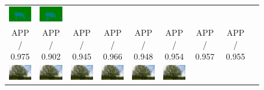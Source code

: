 \documentclass[10pt,twocolumn,letterpaper]{article}
\begin{document}
\begin{figure} [tb]
\begin{tabular*}{0.4\textwidth}{ccccccccc}
\includegraphics[width=2.15cm]{images/1_30_s_J_lmnn_5_label.jpg} & \hspace{-5mm}
\includegraphics[width=2.15cm]{images/1_30_s_A_lmnn_5_label.jpg} & \\
\scriptsize{APP / 0.975} & \scriptsize{APP / 0.902} & \scriptsize{APP / 0.945} & \scriptsize{APP / 0.966} & \scriptsize{APP / 0.948}
 & \scriptsize{APP / 0.954} & \scriptsize{APP / 0.957} & \scriptsize{APP / 0.955}\\
\hspace{-2mm}
\includegraphics[width=2.15cm]{images/2_16_s_o_lmnn_5_img.jpg} &\hspace{-5mm}
\includegraphics[width=2.15cm]{images/2_16_s_B_lmnn_5_img.jpg} &\hspace{-5mm}
\includegraphics[width=2.15cm]{images/2_16_s_Z_lmnn_5_img.jpg} &\hspace{-5mm}
\includegraphics[width=2.15cm]{images/2_16_s_R_lmnn_5_img.jpg} &\hspace{-5mm}
\includegraphics[width=2.15cm]{images/2_16_s_S_lmnn_5_img.jpg} &\hspace{-5mm}
\includegraphics[width=2.15cm]{images/2_16_s_A_lmnn_5_img.jpg} & \hspace{-5mm}

\end{tabular*}
\end{figure}
\end{document}

